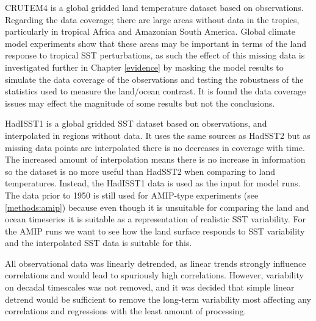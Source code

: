 CRUTEM4 is a global gridded land temperature dataset based on observations.  
Regarding the data coverage; there are large areas without data in the tropics, 
particularly in tropical Africa and Amazonian South America. Global climate 
model experiments show that these areas may be important in terms of the land 
response to tropical SST perturbations, as such the effect of this missing data 
is investigated further in Chapter \ref{evidence} by masking the model results 
to simulate the data coverage of the observations and testing the robustness of 
the statistics used to measure the land/ocean contrast. It is found the data 
coverage issues may effect the magnitude of some results but not the 
conclusions.

HadISST1 is a global gridded SST dataset based on observations, and interpolated 
in regions without data. It uses the same sources as HadSST2 but as missing data 
points are interpolated there is no decreases in coverage with time. The 
increased amount of interpolation means there is no increase in information so 
the dataset is no more useful than HadSST2 when comparing to land temperatures.  
Instead, the HadISST1 data is used as the input for model runs. The data prior 
to 1950 is still used for AMIP-type experiments (see \ref{methods:amip}) because 
even though it is unsuitable for comparing the land and ocean timeseries	it 
is suitable as a representation of realistic SST variability. For the AMIP runs 
we want to see how the land surface responds to SST variability and the 
interpolated SST data is suitable for this.

All observational data was linearly detrended, as linear trends strongly 
influence correlations and would lead to spuriously high correlations.  However,
variability on decadal timescales was not removed, and it was decided that 
simple linear detrend would be sufficient to remove the long-term variability 
most affecting any correlations and regressions with the least amount of 
processing.

% 

